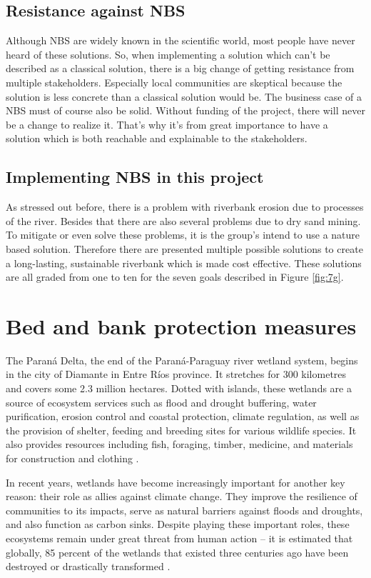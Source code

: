\subsection{Resistance against NBS}

Although NBS are widely known in the scientific world, most people have never heard of these solutions. So, when implementing a solution which can't be described as a classical solution, there is a big change of getting resistance from multiple stakeholders. Especially local communities are skeptical because the solution is less concrete than a classical solution would be. The business case of a NBS must of course also be solid. Without funding of the project, there will never be a change to realize it. That's why it's from great importance to have a solution which is both reachable and explainable to the stakeholders. 

\subsection{Implementing NBS in this project}

As stressed out before, there is a problem with riverbank erosion due to processes of the river. Besides that there are also several problems due to dry sand mining. To mitigate or even solve these problems, it is the group's intend to use a nature based solution. Therefore there are presented multiple possible solutions to create a long-lasting, sustainable riverbank which is made cost effective. These solutions are all graded from one to ten for the seven goals described in Figure \ref{fig:7g}. 


\section{Bed and bank protection measures}
The Paraná Delta, the end of the Paraná-Paraguay river wetland system, begins in the city of Diamante in Entre Ríos province. It stretches for 300 kilometres and covers some 2.3 million hectares. Dotted with islands, these wetlands are a source of ecosystem services such as flood and drought buffering, water purification, erosion control and coastal protection, climate regulation, as well as the provision of shelter, feeding and breeding sites for various wildlife species. It also provides resources including fish, foraging, timber, medicine, and materials for construction and clothing \autocite{hibaParanaRiverEcological2024}.

In recent years, wetlands have become increasingly important for another key reason: their role as allies against climate change. They improve the resilience of communities to its impacts, serve as natural barriers against floods and droughts, and also function as carbon sinks. Despite playing these important roles, these ecosystems remain under great threat from human action – it is estimated that globally, 85 percent of the wetlands that existed three centuries ago have been destroyed or drastically transformed \autocite{hibaParanaRiverEcological2024}.

